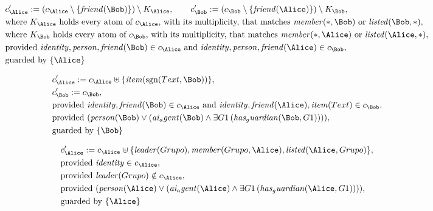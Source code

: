 \begin{align*}
&
c'_
{
\Alice
}
 := 
(c_
{
\Alice
}
 \setminus 
\{
\mathit{
friend
}
(
\Bob
)
\}
) \setminus K_
{
\Alice
}
, \qquad 
c'_
{
\Bob
}
 := 
(c_
{
\Bob
}
 \setminus 
\{
\mathit{
friend
}
(
\Alice
)
\}
) \setminus K_
{
\Bob
}
,\\
&
\text{where } K_
{
\Alice
}
 \text{ holds every atom of } c_
{
\Alice
}
 \text{, with its multiplicity, that matches } 
\mathit{
member
}
(
\ast
,
\Bob
)
 \text{ or } 
\mathit{
listed
}
(
\Bob
,
\ast
)
,\\
&
\text{where } K_
{
\Bob
}
 \text{ holds every atom of } c_
{
\Bob
}
 \text{, with its multiplicity, that matches } 
\mathit{
member
}
(
\ast
,
\Alice
)
 \text{ or } 
\mathit{
listed
}
(
\Alice
,
\ast
)
,\\
&
\text{provided } 
\mathit{
identity
}
,
\mathit{
person
}
,
\mathit{
friend
}
(
\Bob
)
 \in c_
{
\Alice
}
 \text{ and } 
\mathit{
identity
}
,
\mathit{
person
}
,
\mathit{
friend
}
(
\Alice
)
 \in c_
{
\Bob
}
,\\
&
\text{guarded by } \{
\Alice
\}
\end{align*}

\begin{align*}
&
c'_
{
\Alice
}
 := 
c_
{
\Alice
}
 \uplus 
\{
\mathit{
item
}
(
\mathrm{sgn}(
Text
,
\Bob
)
)
\}
,\\
&
c'_
{
\Bob
}
 := 
c_
{
\Bob
}
,\\
&
\text{provided } 
\mathit{
identity
}
,
\mathit{
friend
}
(
\Bob
)
 \in c_
{
\Alice
}
 \text{ and } 
\mathit{
identity
}
,
\mathit{
friend
}
(
\Alice
)
,
\mathit{
item
}
(
Text
)
 \in c_
{
\Bob
}
,\\
&
\text{provided } 
(
\mathit{
person
}
(
\Bob
)
\lor
(
\mathit{
ai_agent
}
(
\Bob
)
\land
\exists 
G1
\,(
\mathit{
has_guardian
}
(
\Bob
,
G1
)
)
)
)
,\\
&
\text{guarded by } \{
\Bob
\}
\end{align*}

\begin{align*}
&
c'_
{
\Alice
}
 := 
c_
{
\Alice
}
 \uplus 
\{
\mathit{
leader
}
(
Grupo
)
,
\mathit{
member
}
(
Grupo
,
\Alice
)
,
\mathit{
listed
}
(
\Alice
,
Grupo
)
\}
,\\
&
\text{provided } 
\mathit{
identity
}
 \in c_
{
\Alice
}
,\\
&
\text{provided } 
\mathit{
leader
}
(
Grupo
)
 \notin c_
{
\Alice
}
,\\
&
\text{provided } 
(
\mathit{
person
}
(
\Alice
)
\lor
(
\mathit{
ai_agent
}
(
\Alice
)
\land
\exists 
G1
\,(
\mathit{
has_guardian
}
(
\Alice
,
G1
)
)
)
)
,\\
&
\text{guarded by } \{
\Alice
\}
\end{align*}
